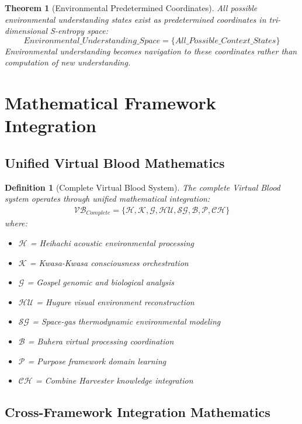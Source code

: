 \documentclass[12pt,a4paper]{article}
\newtheorem{theorem}{Theorem}
\newtheorem{definition}{Definition}
\begin{document}
\begin{theorem}[Environmental Predetermined Coordinates]
All possible environmental understanding states exist as predetermined coordinates in tri-dimensional S-entropy space:
\begin{equation}
Environmental\_Understanding\_Space = \{All\_Possible\_Context\_States\}
\end{equation}
Environmental understanding becomes navigation to these coordinates rather than computation of new understanding.
\end{theorem}

\section{Mathematical Framework Integration}

\subsection{Unified Virtual Blood Mathematics}

\begin{definition}[Complete Virtual Blood System]
The complete Virtual Blood system operates through unified mathematical integration:
\begin{align}
\mathcal{VB}_{Complete} = \{\mathcal{H}, \mathcal{K}, \mathcal{G}, \mathcal{HU}, \mathcal{SG}, \mathcal{B}, \mathcal{P}, \mathcal{CH}\}
\end{align}
where:
\begin{itemize}
\item $\mathcal{H}$ = Heihachi acoustic environmental processing
\item $\mathcal{K}$ = Kwasa-Kwasa consciousness orchestration
\item $\mathcal{G}$ = Gospel genomic and biological analysis
\item $\mathcal{HU}$ = Hugure visual environment reconstruction
\item $\mathcal{SG}$ = Space-gas thermodynamic environmental modeling
\item $\mathcal{B}$ = Buhera virtual processing coordination
\item $\mathcal{P}$ = Purpose framework domain learning
\item $\mathcal{CH}$ = Combine Harvester knowledge integration
\end{itemize}
\end{definition}

\subsection{Cross-Framework Integration Mathematics}
\end{document}
